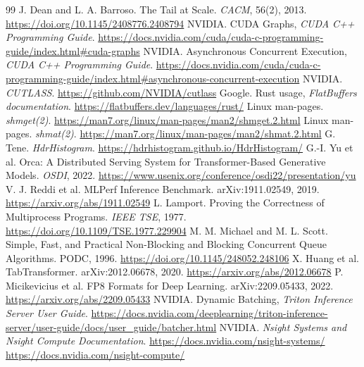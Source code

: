 \documentclass[10pt,a4paper,twocolumn]{article}
\begin{document}
\clearpage
\begin{thebibliography}{99}\small
{} J. Dean and L. A. Barroso. The Tail at Scale. \textit{CACM}, 56(2), 2013. \url{https://doi.org/10.1145/2408776.2408794}
 NVIDIA. CUDA Graphs, \textit{CUDA C++ Programming Guide}. \url{https://docs.nvidia.com/cuda/cuda-c-programming-guide/index.html\#cuda-graphs}
 NVIDIA. Asynchronous Concurrent Execution, \textit{CUDA C++ Programming Guide}. \url{https://docs.nvidia.com/cuda/cuda-c-programming-guide/index.html\#asynchronous-concurrent-execution}
 NVIDIA. \textit{CUTLASS}. \url{https://github.com/NVIDIA/cutlass}
 Google. Rust usage, \textit{FlatBuffers documentation}. \url{https://flatbuffers.dev/languages/rust/}
 Linux man-pages. \textit{shmget(2)}. \url{https://man7.org/linux/man-pages/man2/shmget.2.html}
 Linux man-pages. \textit{shmat(2)}. \url{https://man7.org/linux/man-pages/man2/shmat.2.html}
 G. Tene. \textit{HdrHistogram}. \url{https://hdrhistogram.github.io/HdrHistogram/}
 G.-I. Yu et al. Orca: A Distributed Serving System for Transformer-Based Generative Models. \textit{OSDI}, 2022. \url{https://www.usenix.org/conference/osdi22/presentation/yu}
 V. J. Reddi et al. MLPerf Inference Benchmark. arXiv:1911.02549, 2019. \url{https://arxiv.org/abs/1911.02549}
 L. Lamport. Proving the Correctness of Multiprocess Programs. \textit{IEEE TSE}, 1977. \url{https://doi.org/10.1109/TSE.1977.229904}
 M. M. Michael and M. L. Scott. Simple, Fast, and Practical Non-Blocking and Blocking Concurrent Queue Algorithms. PODC, 1996. \url{https://doi.org/10.1145/248052.248106}
 X. Huang et al. TabTransformer. arXiv:2012.06678, 2020. \url{https://arxiv.org/abs/2012.06678}
 P. Micikevicius et al. FP8 Formats for Deep Learning. arXiv:2209.05433, 2022. \url{https://arxiv.org/abs/2209.05433}
 NVIDIA. Dynamic Batching, \textit{Triton Inference Server User Guide}. \url{https://docs.nvidia.com/deeplearning/triton-inference-server/user-guide/docs/user_guide/batcher.html}
 NVIDIA. \textit{Nsight Systems and Nsight Compute Documentation}. \url{https://docs.nvidia.com/nsight-systems/} \url{https://docs.nvidia.com/nsight-compute/}
\end{thebibliography}
\end{document}
